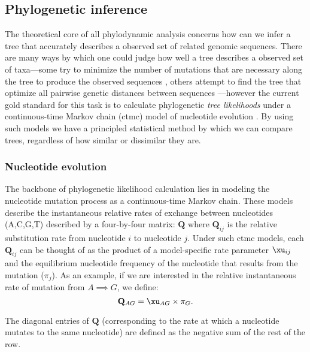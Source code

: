 \subsection{Phylogenetic inference}
The theoretical core of all phylodynamic analysis concerns how can we infer a tree that accurately describes a observed set of related genomic sequences.
There are many ways by which one could judge how well a tree describes a observed set of taxa---some try to minimize the number of mutations that are necessary along the tree to produce the observed sequences \citep{swofford1998phylogenetic}, others attempt to find the tree that optimize all pairwise genetic distances between sequences \citep{farris1972estimating}---however the current gold standard for this task is to calculate phylogenetic \textit{tree likelihoods} under a continuous-time Markov chain (\gls{ctmc}) model of nucleotide evolution \citep{felsenstein1981evolutionary}.
By using such models we have a principled statistical method by which we can compare trees, regardless of how similar or dissimilar they are.

\subsubsection{Nucleotide evolution}
The backbone of phylogenetic likelihood calculation lies in modeling the nucleotide mutation process as a continuous-time Markov chain.
These models describe the instantaneous relative rates of exchange between nucleotides (A,C,G,T) described by a four-by-four matrix: $\mathbf{Q}$ where $\mathbf{Q}_{ij}$ is the relative substitution rate from nucleotide $i$ to nucleotide $j$.
Under such \gls{ctmc} models, each $\mathbf{Q}_{ij}$ can be thought of as the product of a model-specific rate parameter $\xu_{ij}$ and the equilibrium nucleotide frequency of the nucleotide that results from the mutation ($\pi_j$).
As an example, if we are interested in the relative instantaneous rate of mutation from $A \implies G$, we define:
\begin{equation}
  \mathbf{Q}_{AG} = \xu_{AG} \times \pi_G.
\end{equation}

The diagonal entries of $\mathbf{Q}$ (corresponding to the rate at which a nucleotide mutates to the same nucleotide) are defined as the negative sum of the rest of the row.

